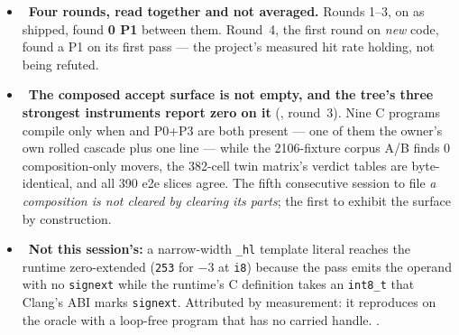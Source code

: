 \begin{itemize}
        cleanly: Rule~1 violated by the clause upholding it. The question was never the name but
        \emph{after \texttt{mutateType(i32)}, is this operand still well-typed?} --- the callee's
        declared parameter type. A name test could not have separated the two cases that decide it:
        the merge emitter's own \texttt{cqrt\_copy\_<W>\_controlled(i32,i32,i32)} is also
        \texttt{cqrt\_*} and its slot \emph{is} \texttt{i32}, so there the retype is the repair.
        An intermediate membership-list fix refused it and broke this increment's own headline.
        Round~4 also filed two P2 over-accepts (a $\phi$ whitelisted on one proved incoming; a
        guard block inside an enclosing loop), both fixed.
  \item \fconfirmed\ \textbf{Four rounds, read together and not averaged.} Rounds 1--3, on
         as shipped, found \textbf{0 P1} between them. Round~4, the first round on
        \emph{new} code, found a P1 on its first pass --- the project's measured hit rate holding,
        not being refuted.
  \item \fconfirmed\ \textbf{The composed accept surface is not empty, and the tree's three
        strongest instruments report zero on it} (, round~3). Nine C programs compile only
        when  and  P0+P3 are both present --- one of them the owner's own rolled
        cascade plus one line --- while the 2106-fixture corpus A/B finds 0 composition-only movers,
        the 382-cell twin matrix's verdict tables are byte-identical, and all 390 e2e slices agree.
        The fifth consecutive session to file \emph{a composition is not cleared by clearing its
        parts}; the first to exhibit the surface by construction.
  \item \fpreexisting\ \textbf{Not this session's:} a narrow-width \texttt{\_hl} template
        literal reaches the runtime zero-extended (\texttt{253} for $-3$ at \texttt{i8}) because the
        pass emits the operand with no \texttt{signext} while the runtime's C definition takes an
        \texttt{int8\_t} that Clang's ABI marks \texttt{signext}. Attributed by measurement: it
        reproduces on the oracle with a loop-free program that has no carried handle. .
\end{itemize}

